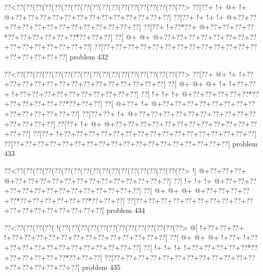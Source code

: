 \vbox{\vbox{\goo
\0??<\0??(\0??(\0??(\0??(\0??(\0??(\0??(\0??(\0??(\0??(\0??(\0??(\0??(\0??(\0??(\0??(\0??(\0??>
\0??[\0??+\- !+\- @+\- !+\- @+\0??+\0??+\0??+\0??+\0??+\0??+\0??+\0??+\0??+\0??+\0??+\0??+\0??]
\0??[\0??+\- !+\- !+\- !+\- @+\0??+\0??+\0??+\0??+\0??+\0??+\0??+\0??+\0??+\0??+\0??+\0??+\0??]
\0??[\0??+\- !+\0??*\0??+\- @+\0??+\0??+\0??+\0??*\0??+\0??+\0??+\0??+\0??+\0??*\0??+\0??+\0??]
\0??[\- @+\- @+\- @+\0??+\0??+\0??+\0??+\0??+\0??+\0??+\0??+\0??+\0??+\0??+\0??+\0??+\0??+\0??]
\0??[\0??+\0??+\0??+\0??+\0??+\0??+\0??+\0??+\0??+\0??+\0??+\0??+\0??+\0??+\0??+\0??+\0??+\0??]
}
\hfil problem 432\hfil\break
}



\vbox{\vbox{\goo
\0??<\0??(\0??(\0??(\0??(\0??(\0??(\0??(\0??(\0??(\0??(\0??(\0??(\0??(\0??(\0??(\0??(\0??(\0??>
\0??[\0??+\- @+\- !+\- !+\0??+\0??+\0??+\0??+\0??+\0??+\0??+\0??+\0??+\0??+\0??+\0??+\0??+\0??]
\0??[\- @+\- @+\- @+\- !+\- !+\0??+\0??+\- !+\0??+\0??+\0??+\0??+\0??+\0??+\0??+\0??+\0??+\0??]
\0??[\- !+\- !+\- !+\- @+\0??+\0??+\0??+\0??+\0??*\0??+\0??+\0??+\0??+\0??+\0??*\0??+\0??+\0??]
\0??[\- @+\0??+\- !+\- @+\0??+\0??+\0??+\0??+\0??+\0??+\0??+\0??+\0??+\0??+\0??+\0??+\0??+\0??]
\0??[\0??+\0??+\- !+\- @+\0??+\0??+\0??+\0??+\0??+\0??+\0??+\0??+\0??+\0??+\0??+\0??+\0??+\0??]
\0??[\0??+\- !+\- @+\- @+\0??+\0??+\0??+\0??+\0??+\0??+\0??+\0??+\0??+\0??+\0??+\0??+\0??+\0??]
\0??[\0??+\- !+\0??+\0??+\0??+\0??+\0??+\0??+\0??+\0??+\0??+\0??+\0??+\0??+\0??+\0??+\0??+\0??]
\0??[\0??+\0??+\0??+\0??+\0??+\0??+\0??+\0??+\0??+\0??+\0??+\0??+\0??+\0??+\0??+\0??+\0??+\0??]
}
\hfil problem 433\hfil\break
}



\vbox{\vbox{\goo
\0??<\0??(\0??(\0??(\0??(\0??(\0??(\0??(\0??(\0??(\0??(\0??(\0??(\0??(\0??(\0??(\0??(\0??(\0??>
\- ![\- @+\0??+\0??+\0??+\- @+\0??+\0??+\0??+\0??+\0??+\0??+\0??+\0??+\0??+\0??+\0??+\0??+\0??]
\0??[\- !+\- !+\- !+\- @+\0??+\0??+\0??+\0??+\0??+\0??+\0??+\0??+\0??+\0??+\0??+\0??+\0??+\0??]
\0??[\- @+\- @+\- @+\- @+\0??+\0??+\0??+\0??+\0??*\0??+\0??+\0??+\0??+\0??+\0??*\0??+\0??+\0??]
\0??[\0??+\0??+\0??+\0??+\0??+\0??+\0??+\0??+\0??+\0??+\0??+\0??+\0??+\0??+\0??+\0??+\0??+\0??]
}
\hfil problem 434\hfil\break
}



\vbox{\vbox{\goo
\0??<\0??(\0??(\0??(\0??(\- !(\0??(\0??(\0??(\0??(\0??(\0??(\0??(\0??(\0??(\0??(\0??(\0??(\0??>
\- @[\- !+\0??+\0??+\0??+\- !+\0??+\0??+\0??+\0??+\0??+\0??+\0??+\0??+\0??+\0??+\0??+\0??+\0??]
\0??[\- @+\- @+\- @+\- !+\0??+\- !+\0??+\0??+\0??+\0??+\0??+\0??+\0??+\0??+\0??+\0??+\0??+\0??]
\0??[\- !+\- !+\- !+\- !+\0??+\0??+\0??+\0??+\0??*\0??+\0??+\0??+\0??+\0??+\0??*\0??+\0??+\0??]
\0??[\0??+\0??+\0??+\0??+\0??+\0??+\0??+\0??+\0??+\0??+\0??+\0??+\0??+\0??+\0??+\0??+\0??+\0??]
}
\hfil problem 435\hfil\break
}



